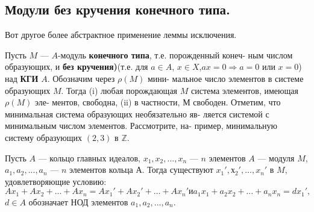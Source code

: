 \documentclass{mai_book}
\begin{document}
\subsection{Модули без кручения конечного типа.}
\noindent Вот другое более абстрактное применение леммы исключения.

\begin{predl}
Пусть $M$ — $A$-модуль \textbf{конечного типа}, т.е. порожденный конеч- \linebreak ным числом образующих, и \textbf{без кручения)}(т.е. для $a \in A$, $x \in X$,\linebreak $ax=0 \Rightarrow a=0$ или $x=0$) над \textbf{КГИ} $A$. Обозначим через $\rho(M)$ мини- \linebreak мальное число элементов в системе образующих $M$. Тогда  
(i) любая порождающая $M$ система элементов, имеющая $\rho(M)$ эле- \linebreak ментов, свободна,  
(ii) в частности, $М$ свободен.  \newpage
Отметим, что минимальная система образующих необязательно яв- \linebreak ляется системой с минимальным числом элементов. Рассмотрите, на- \linebreak пример, минимальную систему образующих $(2,3)$ в $\mathbb{Z}$.
\end{predl} 
\begin{lemma}
Пусть $A$ --- кольцо главных идеалов, $x_1, x_2, ..., x_n$ --- $n$ элементов \linebreak $A$ --- модуля $M$, $a_1, a_2, ..., a_n$ --- $n$ элементов кольца $А$. Тогда существуют \linebreak $x_1', х_2', ..., x_n'$ в $M$, удовлетворяющие условию:  
$$Ax_1 + Ax_2 + ... + Ax_n = Ax_1' + Ax_2' + ... + Ax_n' и a_1x_1 + a_2x_2 + ... + a_nx_n = dx_1',$$
$d \in A$ обозначает НОД элементов $a_1, a_2, ..., a_n$.
\end{lemma}
\end{document}
